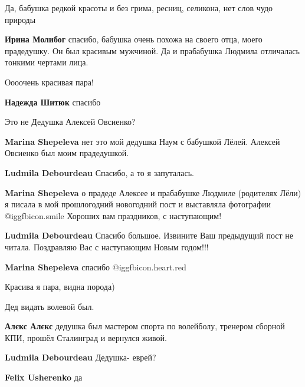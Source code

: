  
 
 
 
 


Да, бабушка редкой красоты и без грима, ресниц, селикона, нет слов чудо природы

\textbf{Ирина Молибог} спасибо, бабушка очень похожа на своего отца, моего прадедушку. Он был красивым мужчиной. Да и прабабушка Людмила отличалась тонкими чертами лица.

Оооочень красивая пара!

\textbf{Надежда Шитюк} спасибо

Это не Дедушка Алексей Овсиенко?

\begin{itemize} %


\textbf{Marina Shepeleva} нет это мой дедушка Наум с бабушкой Лёлей. Алексей Овсиенко был моим прадедушкой.

\textbf{Ludmila Debourdeau} Спасибо, а то я запуталась.

\textbf{Marina Shepeleva} о прадеде Алексее и прабабушке Людмиле (родителях Лёли) я писала в мой прошлогодний новогодний пост и выставляла фотографии @igg{fbicon.smile}  Хороших вам праздников, с наступающим!

\textbf{Ludmila Debourdeau} Спасибо большое. Извините Ваш предыдущий пост не читала. Поздравляю Вас с наступающим Новым годом!!!

\textbf{Marina Shepeleva} спасибо @igg{fbicon.heart.red}

\end{itemize} %

Красива я пара, видна порода)

Дед видать волевой был.

\begin{itemize} %
\textbf{Алєкс Алєкс} дедушка был мастером спорта по волейболу, тренером сборной КПИ, прошёл Сталинград и вернулся живой.

\textbf{Ludmila Debourdeau} Дедушка- еврей?

\textbf{Felix Usherenko} да
\end{itemize} %

